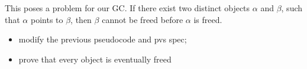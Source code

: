 This poses a problem for our GC\@.
If there exist two distinct objects $\alpha$ and $\beta$, such that $\alpha$ points to $\beta$, then $\beta$ cannot be freed before $\alpha$ is freed.


\begin{itemize}
	\item modify the previous pseudocode and pvs spec;
	\item prove that every object is eventually freed
\end{itemize}
